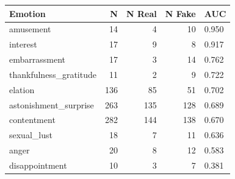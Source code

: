 \begin{tabular}{lrrrl}
\toprule
Emotion & N & N Real & N Fake & AUC \\
\midrule
amusement & 14 & 4 & 10 & 0.950 \\
interest & 17 & 9 & 8 & 0.917 \\
embarrassment & 17 & 3 & 14 & 0.762 \\
thankfulness\_gratitude & 11 & 2 & 9 & 0.722 \\
elation & 136 & 85 & 51 & 0.702 \\
astonishment\_surprise & 263 & 135 & 128 & 0.689 \\
contentment & 282 & 144 & 138 & 0.670 \\
sexual\_lust & 18 & 7 & 11 & 0.636 \\
anger & 20 & 8 & 12 & 0.583 \\
disappointment & 10 & 3 & 7 & 0.381 \\
\bottomrule
\end{tabular}
